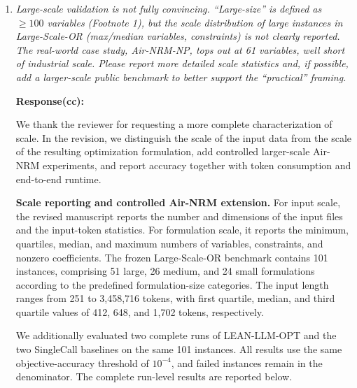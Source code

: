 \documentclass[11pt]{article}
\newcommand{\edit}[1]{{\color{hopkins-blue}\itshape #1}}
\begin{document}
\begin{enumerate}[label=(R2.Major.\arabic*),leftmargin=*]
As shown in Table~\ref{tab:optibench_results}, LEAN-GPT-4.1 correctly solves 430 out of 605 problems (71.07\%), outperforming all main comparison methods, including GPT-5.2 (69.10\%) and LLMOPT (66.44\%). LEAN-gpt-oss-20b achieves the highest accuracy of 73.39\% (444/605), also outperforming all main comparison methods.

Together with the ComplexOR results, these additional results provide further evidence that LEAN-LLM-OPT performs effectively across different public optimization modeling benchmarks, supporting the broader applicability of our framework.


\item \edit{Large-scale validation is not fully convincing. ``Large-size'' is defined as $\geq 100$ variables (Footnote 1), but the scale distribution of large instances in Large-Scale-OR (max/median variables, constraints) is not clearly reported. The real-world case study, Air-NRM-NP, tops out at 61 variables, well short of industrial scale. Please report more detailed scale statistics and, if possible, add a larger-scale public benchmark to better support the ``practical'' framing.}\label{R2-major-2}

\noindent\textbf{Response(cc):}

We thank the reviewer for requesting a more complete characterization of
scale. In the revision, we distinguish the scale of the input data from the
scale of the resulting optimization formulation, add controlled larger-scale
Air-NRM experiments, and report accuracy together with token consumption and
end-to-end runtime.

\medskip
\noindent\textbf{Scale reporting and controlled Air-NRM extension.}
For input scale, the revised manuscript reports the number and dimensions of
the input files and the input-token statistics. For formulation scale, it
reports the minimum, quartiles, median, and maximum numbers of variables,
constraints, and nonzero coefficients. The frozen Large-Scale-OR benchmark
contains 101 instances, comprising 51 large, 26 medium, and 24 small
formulations according to the predefined formulation-size categories. The
input length ranges from 251 to 3,458,716 tokens, with first quartile, median,
and third quartile values of 412, 648, and 1,702 tokens, respectively.

We additionally evaluated two complete runs of LEAN-LLM-OPT and the two
SingleCall baselines on the same 101 instances. All results use the same
objective-accuracy threshold of $10^{-4}$, and failed instances remain in the
denominator. The complete run-level results are reported below.


\end{enumerate}
\end{document}
